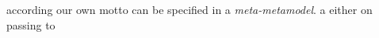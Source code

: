 according our own motto can be specified in a \emph{meta-metamodel}. 
% 
a 
either 
% 
% 
on 
passing 
to 
% 
% 
